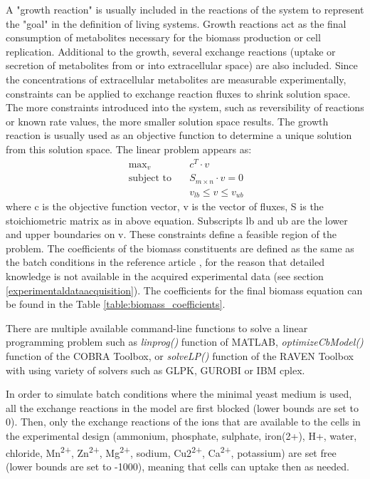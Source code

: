 A "growth reaction" is usually included in the reactions of the system to represent the "goal" in the definition of living systems. Growth reactions act as the final consumption of metabolites necessary for the biomass production or cell replication. Additional to the growth, several exchange reactions (uptake or secretion of metabolites from or into extracellular space) are also included. Since the concentrations of extracellular metabolites are measurable experimentally, constraints can be applied to exchange reaction fluxes to shrink solution space. The more constraints introduced into the system, such as reversibility of reactions or known rate values, the more smaller solution space results. The growth reaction is usually used as an objective function to determine a unique solution from this solution space. The linear problem appears as:
\begin{align}
 \ \text{max}_v \quad & c^T \cdot v \\
 \label{eq:fba}
 \ \text{subject to} \quad & S_{m \times n} \cdot v=0 \\
 \ & v_{lb} \leq v \leq v_{ub}
\end{align}
\noindent where c is the objective function vector, v is the vector of fluxes, S is the stoichiometric matrix as in above equation. Subscripts lb and ub are the lower and upper boundaries on v. These constraints define a feasible region of the problem. The coefficients of the biomass constituents are defined as the same as the batch conditions in the reference article \cite{nilsson2016metabolic}, for the reason that detailed knowledge is not available in the acquired experimental data (see section \ref{experimentaldataacquisition}). The coefficients for the final biomass equation can be found in the Table \ref{table:biomass_coefficients}.



There are multiple available command-line functions to solve a linear programming problem such as \emph{linprog()} function of MATLAB, \emph{optimizeCbModel()} function of the COBRA Toolbox, or \emph{solveLP()} function of the RAVEN Toolbox with using variety of solvers such as GLPK, GUROBI or IBM cplex.

In order to simulate batch conditions where the minimal yeast medium is used, all the exchange reactions in the model are first blocked (lower bounds are set to 0). Then, only the exchange reactions of the ions that are available to the cells in the experimental design (ammonium, phosphate, sulphate, iron(2+), H+, water, chloride, Mn\textsuperscript{2+}, Zn\textsuperscript{2+}, Mg\textsuperscript{2+}, sodium, Cu2\textsuperscript{2+}, Ca\textsuperscript{2+}, potassium) are set free (lower bounds are set to -1000), meaning that cells can uptake then as needed.


